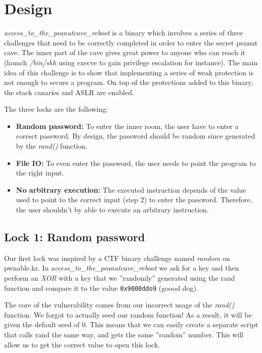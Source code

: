 \section{Design}
\emph{access\_to\_the\_peanutcave\_reboot} is a binary which involves a series of three challenges that need to be correctly completed in order to enter the secret peanut cave. The inner part of the cave gives great power to anyone who can reach it (launch \emph{/bin/shh} using execve to gain privilege escalation for instance). The main idea of this challenge is to show that implementing a series of weak protection is not enough to secure a program. On top of the protections added to this binary, the stack canaries and ASLR are enabled.

The three locks are the following:

\begin{itemize}
  \item \textbf{Random password:} To enter the inner room, the user have to enter a correct password. By design, the password should be random since generated by the \emph{rand()} function.

  \item \textbf{File IO:} To even enter the password, the user needs to point the program to the right input.
    
  \item \textbf{No arbitrary execution:} The executed instruction depends of the value used to point to the correct input (step 2) to enter the password. Therefore, the user shouldn't by able to execute an arbitrary instruction.
\end{itemize}

\subsection {Lock 1: Random password}
Our first lock was inspired by a CTF binary challenge named \emph{random} on pwnable.kr. In \emph{access\_to\_the\_peanutcave\_reboot} we ask for a key and then perform an \emph{XOR} with a key that we ''randomly'' generated using the rand function and compare it to the value {\tt0x9000ddo9} (goood dog). 

The core of the vulnerability comes from our incorrect usage of the \emph{rand()} function. We forgot to actually seed our random function! As a result, it will be given the default seed of 0. This means that we can easily create a separate script that calls rand the same way, and gets the same ''random'' number. This will allow us to get the correct value to open this lock. 

